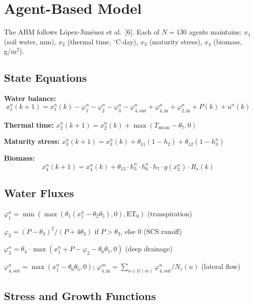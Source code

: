 \documentclass[12pt, a4paper]{article}
\begin{document}
\section{Agent-Based Model}

The ABM follows L\'{o}pez-Jim\'{e}nez et al.~[6]. Each of $N = 130$ agents maintains: $x_1$ (soil water, mm), $x_2$ (thermal time, $^{\circ}$C$\cdot$day), $x_3$ (maturity stress), $x_4$ (biomass, g/m$^2$).

\subsection{State Equations}

\textbf{Water balance:}
\begin{equation}
x_1^n(k\!+\!1) = x_1^n(k) - \varphi_1^n - \varphi_2^n - \varphi_3^n - \varphi_{4,\text{out}}^n + \varphi_{4,\text{in}}^n + \varphi_{2,\text{in}}^n + P(k) + u^n(k)
\label{eq:water}
\end{equation}

\textbf{Thermal time:} $x_2^n(k+1) = x_2^n(k) + \max(T_{\text{mean}} - \theta_7, 0)$

\textbf{Maturity stress:} $x_3^n(k+1) = x_3^n(k) + \theta_{11}(1-h_2) + \theta_{12}(1-h_3^n)$

\textbf{Biomass:}
\begin{equation}
x_4^n(k\!+\!1) = x_4^n(k) + \theta_{13} \cdot h_3^n \cdot h_6^n \cdot h_7 \cdot g(x_2^n) \cdot R_s(k)
\label{eq:biomass}
\end{equation}

\subsection{Water Fluxes}

$\varphi_1^n = \min(\max(\theta_1(x_1^n - \theta_2\theta_5), 0), \text{ET}_0)$ (transpiration)

$\varphi_2 = (P-\theta_3)^2/(P+4\theta_3)$ if $P > \theta_3$, else 0 (SCS runoff)

$\varphi_3^n = \theta_4 \cdot \max(x_1^n + P - \varphi_2 - \theta_6\theta_5, 0)$ (deep drainage)

$\varphi_{4,\text{out}}^n = \max(x_1^n - \theta_6\theta_5, 0)$; $\varphi_{4,\text{in}}^m = \sum_{n \in \mathcal{U}(m)} \varphi_{4,\text{out}}^n / N_r(n)$ (lateral flow)

\subsection{Stress and Growth Functions}
\end{document}
